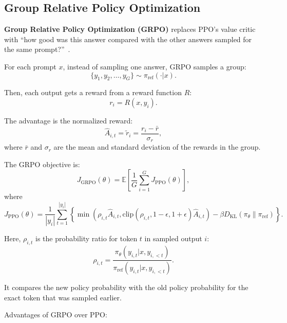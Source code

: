 \subsection{Group Relative Policy Optimization}
\label{sec:grpo}

\textbf{Group Relative Policy Optimization (GRPO)} replaces PPO's value critic with ``how good was this answer compared with the other answers sampled for the same prompt?''~\cite{shao2024deepseekmath}.

For each prompt \(x\), instead of sampling one answer, GRPO samples a group:
\[
	\{ y_1, y_2, \dots, y_G \} \sim \pi_\text{ref}(\cdot | x).
\]

Then, each output gets a reward from a reward function \(R\):
\begin{equation}
	r_i = R(x, y_i).
\end{equation}

The advantage is the normalized reward:
\begin{equation}
	\hat{A}_{i, t} = \tilde{r}_i = \frac{r_i - \bar{r}}{\sigma_r},
\end{equation}
where \(\bar{r}\) and \(\sigma_r\) are the mean and standard deviation of the rewards in the group.

The GRPO objective is:
\begin{equation}
	J_\text{GRPO}(\theta) = \mathbb{E} \left[
		\frac{1}{G} \sum_{i = 1}^G J_\text{PPO}(\theta)
		\right],
\end{equation}
where
\begin{equation}
	J_\text{PPO}(\theta) = \frac{1}{|y_i|} \sum_{t = 1}^{|y_i|} \left\{
	\min \left(
	\rho_{i,t}\hat{A}_{i,t}, \text{clip}(\rho_{i,t}, 1 - \epsilon, 1 + \epsilon) \hat{A}_{i,t}
	\right) - \beta D_\text{KL} \left( \pi_\theta \| \pi_\text{ref} \right)
	\right\}.
\end{equation}

Here, \(\rho_{i,t}\) is the probability ratio for token \(t\) in sampled output \(i\):
\begin{equation}
	\rho_{i, t} = \frac{
		\pi_\theta(y_{i, t} | x, y_{i, < t})
	}{
		\pi_\text{ref}(y_{i, t} | x, y_{i, < t})
	}.
\end{equation}

It compares the new policy probability with the old policy probability for the exact token that was sampled earlier.

Advantages of GRPO over PPO:
\UnorderListBegin
{}
\UnorderListEnd
